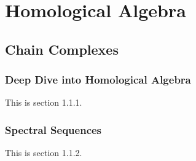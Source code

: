 \documentclass{article}
\begin{document}
\section{Homological Algebra}
\subsection{Chain Complexes}

\subsubsection{Deep Dive into Homological Algebra}
This is section 1.1.1.

\subsubsection{Spectral Sequences}
This is section 1.1.2.
\end{document}
